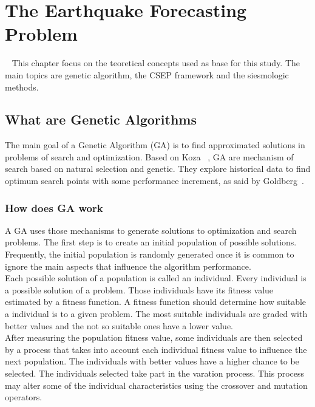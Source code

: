 \chapter{The Earthquake Forecasting Problem}~\label{chapter2}
This chapter focus on the teoretical concepts used as base for this study. The main topics are genetic algorithm, the CSEP framework and the siesmologic methods.\\

\section{What are Genetic Algorithms}
The main goal of a Genetic Algorithm (GA) is to find approximated solutions in problems of search and optimization. Based on Koza~\cite{Koza2003} , GA are mechanism of search based on natural selection and genetic. They explore historical data to find optimum search points with some performance increment, as said by Goldberg~\cite{Goldberg:1989:GAS:534133}.\\

\subsection{How does GA work}

A GA uses those mechanisms to generate solutions to optimization and search problems. The first step is to create an initial population of possible solutions. Frequently, the initial population is randomly generated once it is common to ignore the main aspects that influence the algorithm performance.\\

Each possible solution of a population is called an individual. Every individual is a possible solution of a problem. Those individuals have its fitness value estimated by a fitness function. A fitness function should determine how suitable a individual is to a given problem. The most suitable individuals are graded with better values and the not so suitable ones have a lower value.\\

After measuring the population fitness value, some individuals are then selected by a process that takes into account each individual fitness value to influence the next population. The individuals with better values have a higher chance to be selected. The individuals selected take part in the varation process. This process may alter some of the individual characteristics using the crossover and mutation operators.\\

